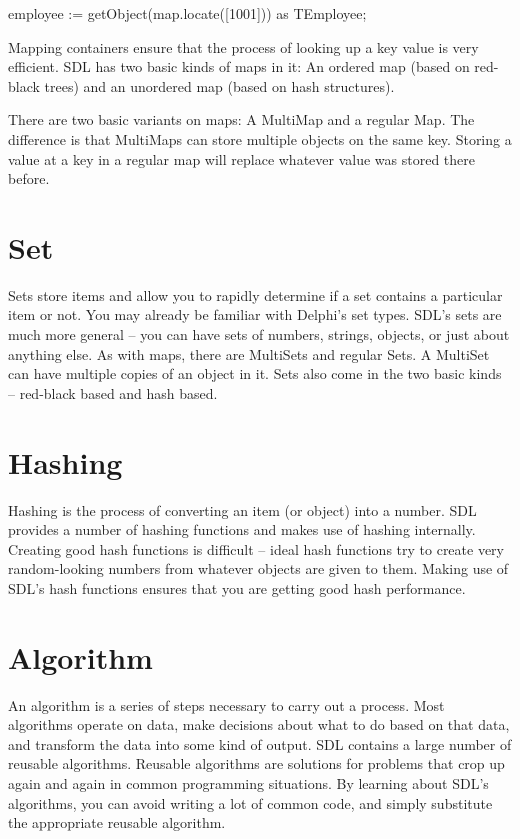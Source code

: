 \documentclass{report}
\begin{document}
employee := getObject(map.locate([1001])) as TEmployee;

Mapping containers ensure that the process of looking up a key value is very
efficient. SDL has two basic kinds of maps in it: An ordered map (based on
red-black trees) and an unordered map (based on hash structures).

There are two basic variants on maps: A MultiMap and a regular Map. The
difference is that MultiMaps can store multiple objects on the same key.
Storing a value at a key in a regular map will replace whatever value was
stored there before.

\section{Set}

Sets store items and allow you to rapidly determine if a set contains a
particular item or not. You may already be familiar with Delphi's set types. 
SDL's sets are much more general -- you can have sets of numbers, strings,
objects, or just about anything else. As with maps, there are MultiSets and
regular Sets. A MultiSet can have multiple copies of an object in it. Sets
also come in the two basic kinds -- red-black based and hash based.

\section{Hashing}

Hashing is the process of converting an item (or object) into a number. SDL
provides a number of hashing functions and makes use of hashing internally.
Creating good hash functions is difficult -- ideal hash functions try to
create very random-looking numbers from whatever objects are given to them.
Making use of SDL's hash functions ensures that you
are getting good hash performance.

\section{Algorithm}

An algorithm is a series of steps necessary to carry out a process. Most
algorithms operate on data, make decisions about what to do based on that
data, and transform the data into some kind of output. SDL contains a large
number of reusable algorithms. Reusable algorithms are solutions for
problems that crop up again and again in common programming situations. By
learning about SDL's algorithms, you can avoid writing a lot of common
code, and simply substitute the appropriate reusable algorithm.
\end{document}
